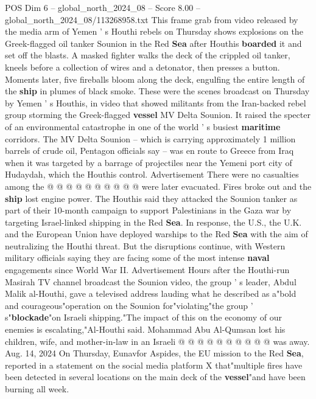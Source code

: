 \begin{textsample}{POS Dim 6 – global\_north\_2024\_08 – Score 8.00 – global\_north\_2024\_08/113268958.txt}  \label{ex:f6_pos_371}
This frame grab from video released by the media arm of Yemen ' s Houthi rebels on Thursday shows explosions on the Greek-flagged oil tanker Sounion in the Red \textbf{Sea} after Houthis \textbf{boarded} it and set off the blasts.
A masked fighter walks the deck of the crippled oil tanker, kneels before a collection of wires and a detonator, then presses a button.
Moments later, five fireballs bloom along the deck, engulfing the entire length of the \textbf{ship} in plumes of black smoke.
These were the scenes broadcast on Thursday by Yemen ' s Houthis, in video that showed militants from the Iran-backed rebel group storming the Greek-flagged \textbf{vessel} MV Delta Sounion.
It raised the specter of an environmental catastrophe in one of the world ' s busiest \textbf{maritime} corridors.
The MV Delta Sounion -- which is carrying approximately 1 million barrels of crude oil, Pentagon officials say -- was en route to Greece from Iraq when it was targeted by a barrage of projectiles near the Yemeni port city of Hudaydah, which the Houthis control.
Advertisement There were no casualties among the @ @ @ @ @ @ @ @ @ @ were later evacuated.
Fires broke out and the \textbf{ship} lost engine power.
The Houthis said they attacked the Sounion tanker as part of their 10-month campaign to support Palestinians in the Gaza war by targeting Israel-linked shipping in the Red \textbf{Sea}.
In response, the U.S., the U.K. and the European Union have deployed warships to the Red \textbf{Sea} with the aim of neutralizing the Houthi threat.
But the disruptions continue, with Western military officials saying they are facing some of the most intense \textbf{naval} engagements since World War II.
Advertisement Hours after the Houthi-run Masirah TV channel broadcast the Sounion video, the group ' s leader, Abdul Malik al-Houthi, gave a televised address lauding what he described as a"bold and courageous"operation on the Sounion for"violating"the group ' s"\textbf{blockade}"on Israeli shipping."The impact of this on the economy of our enemies is escalating,"Al-Houthi said.
Mohammad Abu Al-Qumsan lost his children, wife, and mother-in-law in an Israeli @ @ @ @ @ @ @ @ @ @ was away.
Aug. 14, 2024 On Thursday, Eunavfor Aspides, the EU mission to the Red \textbf{Sea}, reported in a statement on the social media platform X that"multiple fires have been detected in several locations on the main deck of the \textbf{vessel}"and have been burning all week.

\end{textsample}
